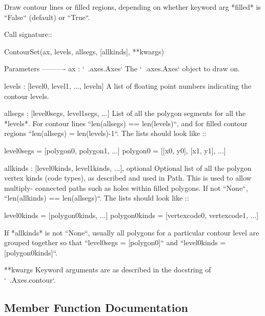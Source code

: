 \begin{DoxyVerb}Draw contour lines or filled regions, depending on
whether keyword arg *filled* is ``False`` (default) or ``True``.

Call signature::

    ContourSet(ax, levels, allsegs, [allkinds], **kwargs)

Parameters
----------
ax : `~.axes.Axes`
    The `~.axes.Axes` object to draw on.

levels : [level0, level1, ..., leveln]
    A list of floating point numbers indicating the contour
    levels.

allsegs : [level0segs, level1segs, ...]
    List of all the polygon segments for all the *levels*.
    For contour lines ``len(allsegs) == len(levels)``, and for
    filled contour regions ``len(allsegs) = len(levels)-1``. The lists
    should look like ::

level0segs = [polygon0, polygon1, ...]
polygon0 = [[x0, y0], [x1, y1], ...]

allkinds : [level0kinds, level1kinds, ...], optional
    Optional list of all the polygon vertex kinds (code types), as
    described and used in Path. This is used to allow multiply-
    connected paths such as holes within filled polygons.
    If not ``None``, ``len(allkinds) == len(allsegs)``. The lists
    should look like ::

level0kinds = [polygon0kinds, ...]
polygon0kinds = [vertexcode0, vertexcode1, ...]

    If *allkinds* is not ``None``, usually all polygons for a
    particular contour level are grouped together so that
    ``level0segs = [polygon0]`` and ``level0kinds = [polygon0kinds]``.

**kwargs
    Keyword arguments are as described in the docstring of
    `~.Axes.contour`.
\end{DoxyVerb}
 

\subsection{Member Function Documentation}
\mbox{\label{classmatplotlib_1_1contour_1_1ContourSet_a3f2596db08663b329359e2bb045b7cfc}} 
